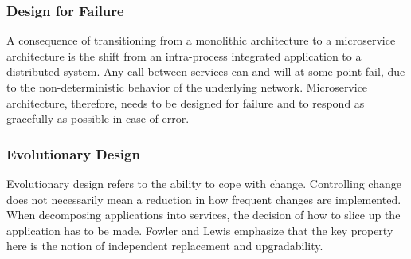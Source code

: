 \subsubsection*{Design for Failure}


A consequence of transitioning from a monolithic architecture to a microservice architecture is the shift from an intra-process integrated application to a distributed system. Any call between services can and will at some point fail, due to the non-deterministic behavior of the underlying network. Microservice architecture, therefore, needs to be designed for failure and to respond as gracefully as possible in case of error. 

\subsubsection*{Evolutionary Design}
Evolutionary design refers to the ability to cope with change. Controlling change does not necessarily mean a reduction in how frequent changes are implemented. When decomposing applications into services, the decision of how to slice up the application has to be made. Fowler and Lewis emphasize that the key property here is the notion of independent replacement and upgradability.